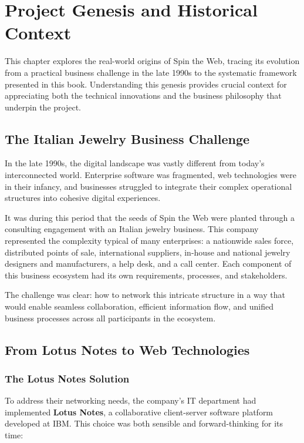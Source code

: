 \chapter{Project Genesis and Historical Context}
\label{chap:genesis}

This chapter explores the real-world origins of Spin the Web, tracing its evolution from a practical business challenge in the late 1990s to the systematic framework presented in this book. Understanding this genesis provides crucial context for appreciating both the technical innovations and the business philosophy that underpin the project.

\section{The Italian Jewelry Business Challenge}

In the late 1990s, the digital landscape was vastly different from today's interconnected world. Enterprise software was fragmented, web technologies were in their infancy, and businesses struggled to integrate their complex operational structures into cohesive digital experiences.

It was during this period that the seeds of Spin the Web were planted through a consulting engagement with an Italian jewelry business. This company represented the complexity typical of many enterprises: a nationwide sales force, distributed points of sale, international suppliers, in-house and national jewelry designers and manufacturers, a help desk, and a call center. Each component of this business ecosystem had its own requirements, processes, and stakeholders.

The challenge was clear: how to network this intricate structure in a way that would enable seamless collaboration, efficient information flow, and unified business processes across all participants in the ecosystem.

\section{From Lotus Notes to Web Technologies}

\subsection{The Lotus Notes Solution}

To address their networking needs, the company's IT department had implemented \textbf{Lotus Notes}, a collaborative client-server software platform developed at IBM. This choice was both sensible and forward-thinking for its time:

